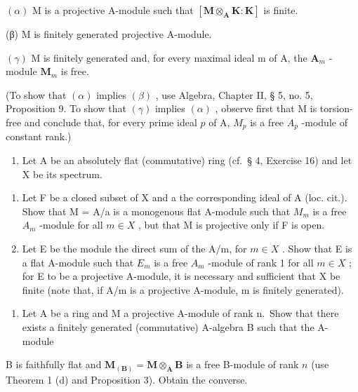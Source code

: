 \((\alpha)\) M is a projective A-module such that \([\mathbf{M} \otimes_{\mathbf{A}} \mathbf{K} : \mathbf{K}]\) is finite.

(β) M is finitely generated projective A-module.

\((\gamma)\) M is finitely generated and, for every maximal ideal m of A, the \(\mathbf{A}_{m}\) -module \(\mathbf{M}_{m}\) is free.

(To show that \((\alpha)\) implies \((\beta)\) , use Algebra, Chapter II, § 5, no. 5, Proposition 9. To show that \((\gamma)\) implies \((\alpha)\) , observe first that M is torsion-free and conclude that, for every prime ideal \(p\) of A, \(M_{p}\) is a free \(A_{p}\) -module of constant rank.)

\begin{enumerate}
\def\labelenumi{\arabic{enumi}.}
\setcounter{enumi}{6}
\tightlist
\item
  Let A be an absolutely flat (commutative) ring (cf.~§ 4, Exercise 16) and let X be its spectrum.
\end{enumerate}

\begin{enumerate}
\def\labelenumi{(\alph{enumi})}
\item
  Let F be a closed subset of X and a the corresponding ideal of A (loc. cit.). Show that M = A/a is a monogenous flat A-module such that \(M_{m}\) is a free \(A_{m}\) -module for all \(m \in X\) , but that M is projective only if F is open.
\item
  Let E be the module the direct sum of the A/m, for \(m \in X\) . Show that E is a flat A-module such that \(E_{m}\) is a free \(A_{m}\) -module of rank 1 for all \(m \in X\) ; for E to be a projective A-module, it is necessary and sufficient that X be finite (note that, if A/m is a projective A-module, m is finitely generated).
\end{enumerate}

\begin{enumerate}
\def\labelenumi{\arabic{enumi}.}
\setcounter{enumi}{7}
\tightlist
\item
  Let A be a ring and M a projective A-module of rank n.~Show that there exists a finitely generated (commutative) A-algebra B such that the A-module
\end{enumerate}

B is faithfully flat and \(\mathbf{M}_{(\mathbf{B})} = \mathbf{M} \otimes_{\mathbf{A}} \mathbf{B}\) is a free B-module of rank \(n\) (use Theorem 1 (d) and Proposition 3). Obtain the converse.

